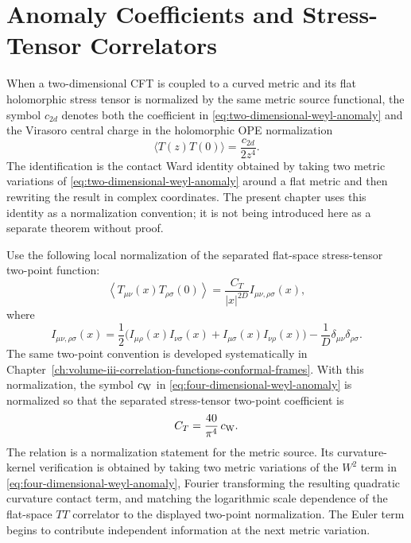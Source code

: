 \section{Anomaly Coefficients and Stress-Tensor Correlators}

\begin{convention}
\label{conv:two-dimensional-central-charge-weyl-anomaly}
When a two-dimensional CFT is coupled to a curved metric and its flat
holomorphic stress tensor is normalized by the same metric source functional,
the symbol \(c_{2d}\) denotes both the coefficient in
\eqref{eq:two-dimensional-weyl-anomaly} and the Virasoro central charge in the
holomorphic OPE normalization
\[
  \langle T(z)T(0)\rangle=\frac{c_{2d}}{2z^4}.
\]
The identification is the contact Ward identity obtained by taking two metric
variations of \eqref{eq:two-dimensional-weyl-anomaly} around a flat metric and
then rewriting the result in complex coordinates.  The present chapter uses
this identity as a normalization convention; it is not being introduced here
as a separate theorem without proof.
\end{convention}

\begin{convention}
\label{conv:four-dimensional-ct-cw-normalization}
Use the following local normalization of the separated flat-space
stress-tensor two-point function:
\[
  \left\langle T_{\mu\nu}(x)T_{\rho\sigma}(0)\right\rangle
  =
  \frac{C_T}{|x|^{2D}}
  I_{\mu\nu,\rho\sigma}(x),
\]
where
\[
  I_{\mu\nu,\rho\sigma}(x)
  =
  \frac12\bigl(
    I_{\mu\rho}(x)I_{\nu\sigma}(x)
    +
    I_{\mu\sigma}(x)I_{\nu\rho}(x)
  \bigr)
  -
  \frac1D\delta_{\mu\nu}\delta_{\rho\sigma}.
\]
The same two-point convention is developed systematically in
Chapter~\ref{ch:volume-iii-correlation-functions-conformal-frames}.  With
this normalization, the symbol \(c_{\rm W}\) in
\eqref{eq:four-dimensional-weyl-anomaly} is normalized so that the separated
stress-tensor two-point coefficient is
\begin{equation}
  C_T=\frac{40}{\pi^4}\,c_{\rm W}.
  \label{eq:four-dimensional-ct-cw-relation}
\end{equation}
The relation is a normalization statement for the metric source.  Its
curvature-kernel verification is obtained by taking two metric variations of
the \(W^2\) term in \eqref{eq:four-dimensional-weyl-anomaly}, Fourier
transforming the resulting quadratic curvature contact term, and matching the
logarithmic scale dependence of the flat-space \(TT\) correlator to the
displayed two-point normalization.  The Euler term begins to contribute
independent information at the next metric variation.
\end{convention}

